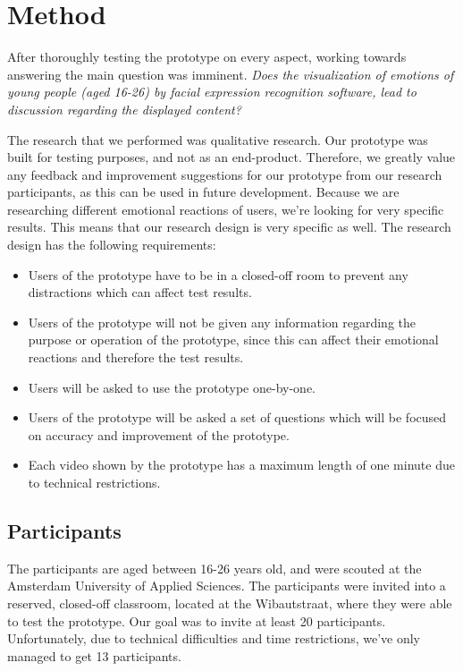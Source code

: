 \documentclass[sigconf]{acmart}
\begin{document}

\section{Method} \label{method}
After thoroughly testing the prototype on every aspect, working towards answering the main question was imminent.
\emph{Does the visualization of emotions of young people (aged 16-26) by facial expression
recognition software, lead to discussion regarding the displayed content?}

The research that we performed was qualitative research. Our prototype was built for testing purposes, and not
as an end-product. Therefore, we greatly value any feedback and improvement suggestions for our prototype from
our research participants, as this can be used in future development. Because we are researching
different emotional reactions of users, we're looking for very specific results. This means that our research
design is very specific as well. The research design has the following requirements:
\begin{itemize}
    \item{Users of the prototype have to be in a closed-off room to prevent any distractions which can affect
    test results.}
    \item{Users of the prototype will not be given any information regarding the purpose or operation of the
    prototype, since this can affect their emotional reactions and therefore the test results.}
    \item{Users will be asked to use the prototype one-by-one.}
    \item{Users of the prototype will be asked a set of questions which will be focused on accuracy
    and improvement of the prototype.}
    \item{Each video shown by the prototype has a maximum length of one minute due to technical restrictions.}
\end{itemize}

\subsection{Participants}
The participants are aged between 16-26 years old, and were scouted at the Amsterdam University of Applied
Sciences. The participants were invited into a reserved, closed-off classroom, located at the Wibautstraat, where
they were able to test the prototype. Our goal was to invite at least 20 participants. Unfortunately, due to
technical difficulties and time restrictions, we've only managed to get 13 participants.
\end{document}
